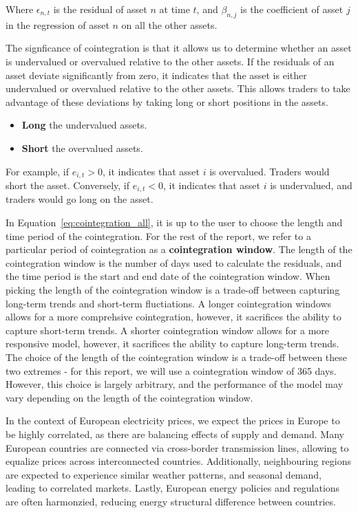 \documentclass[12pt]{article}
\begin{document}
\noindent
Where $\epsilon_{n,t}$ is the residual of asset $n$ at time $t$, and $\beta_{n,j}$ is the coefficient of asset $j$ in the regression of asset $n$ on all the other assets. 

\vspace{10pt}
\noindent
The signficance of cointegration is that it allows us to determine whether an asset is undervalued or overvalued relative to the other assets. If the residuals of an asset deviate significantly from zero, it indicates that the asset is either undervalued or overvalued relative to the other assets. This allows traders to take advantage of these deviations by taking long or short positions in the assets.

\begin{itemize}
  \item \textbf{Long} the undervalued assets.
  \item \textbf{Short} the overvalued assets.
\end{itemize}

\vspace{10pt}
\noindent
For example, if $e_{i,t} > 0$, it indicates that asset $i$ is overvalued. Traders would short the asset. Conversely, if $e_{i,t} < 0$, it indicates that asset $i$ is undervalued, and traders would go long on the asset.

\vspace{10pt}
\noindent
In Equation~\ref{eq:cointegration_all}, it is up to the user to choose the length and time period of the cointegration. For the rest of the report, we refer to a particular period of cointegration as a \textbf{cointegration window}. The length of the cointegration window is the number of days used to calculate the residuals, and the time period is the start and end date of the cointegration window.
When picking the length of the cointegration window is a trade-off between capturing long-term trends and short-term fluctiations. A longer cointegration windows allows for a more comprehsive cointegration, however, it sacrifices the ability to capture short-term trends. A shorter cointegration window allows for a more responsive model, however, it sacrifices the ability to capture long-term trends. The choice of the length of the cointegration window is a trade-off between these two extremes - for this report, we will use a cointegration window of 365 days. However, this choice is largely arbitrary, and the performance of the model may vary depending on the length of the cointegration window.  

\vspace{10pt}
\noindent
In the context of European electricity prices, we expect the prices in Europe to be highly correlated, as there are balancing effects of supply and demand. Many European countries are connected via cross-border transmission lines, allowing to equalize prices across interconnected countries. Additionally, neighbouring regions are expected to experience similar weather patterns, and seasonal demand, leading to correlated markets. Lastly, European energy policies and regulations are often harmonzied, reducing energy structural difference between countries.
\end{document}
